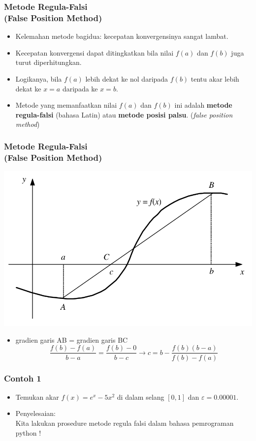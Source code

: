 \documentclass[pdflatex,compress]{beamer}
\begin{document}
\begin{frame}
	\frametitle{Metode Regula-Falsi\\(False Position Method)}
	\begin{itemize}
		\item Kelemahan metode bagidua: kecepatan konvergensinya sangat lambat.
		\item Kecepatan konvergensi dapat ditingkatkan bila nilai $ f(a) $ dan $ f(b) $ juga turut diperhitungkan.
		\item Logikanya, bila $ f(a) $ lebih dekat ke nol daripada $ f(b) $ tentu akar lebih dekat ke $ x = a $ daripada ke $ x = b $.
		\item Metode yang memanfaatkan nilai $ f(a) $ dan $ f(b) $ ini adalah \textbf{metode regula-falsi} (bahasa Latin) atau \textbf{metode posisi palsu}. (\textit{false position method})
	\end{itemize}
\end{frame}

\begin{frame}
	\frametitle{Metode Regula-Falsi\\(False Position Method)}
	\begin{center}
		\includegraphics[width=0.6\linewidth]{img/img10}
	\end{center}
	\begin{itemize}
		\item[] gradien garis AB = gradien garis BC
		\[ \frac{f(b) - f(a)}{b - a} = \frac{f(b) - 0}{b - c} \rightarrow c = b - \frac{f(b)(b-a)}{f(b)-f(a)}\]
	\end{itemize}
\end{frame}

\begin{frame}
	\frametitle{Contoh 1}
	\begin{itemize}
		\item Temukan akar $ f(x) = e^x - 5x^2 $ di dalam selang $ [0, 1] $ dan $ \varepsilon = 0.00001 $.
		\item Penyelesaian:\\Kita lakukan prosedure metode regula falsi dalam bahasa pemrograman python !
	\end{itemize}
\end{frame}
\end{document}

